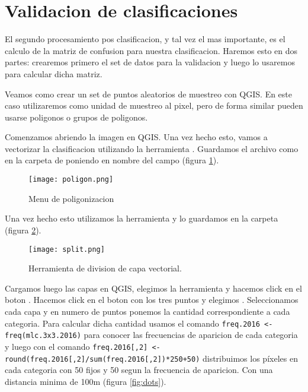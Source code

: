 \section{Validacion de clasificaciones}

El segundo procesamiento pos clasificacion, y tal vez el mas importante, es el calculo de la matriz de confusion para nuestra clasificacion. Haremos esto en dos partes: crearemos primero el set de datos para la validacion y luego lo usaremos para calcular dicha matriz.

\begin{exa}
  Veamos como crear un set de puntos aleatorios de muestreo con QGIS. En este caso utilizaremos como unidad de muestreo al pixel, pero de forma similar pueden usarse poligonos o grupos de poligonos.

  Comenzamos abriendo la imagen  en QGIS. Una vez hecho esto, vamos a vectorizar la clasificacion utilizando la herramienta . Guardamos el archivo como  en la carpeta de  poniendo en nombre del campo  (figura \ref{fig:poligon}).

  \begin{figure}
    \texttt{[image: poligon.png]}
    \caption{Menu de poligonizacion}
    \label{fig:poligon}
  \end{figure}

  Una vez hecho esto utilizamos la herramienta  y lo
  guardamos en la carpeta  (figura \ref{fig:split}).

  \begin{figure}
    \texttt{[image: split.png]}
    \caption{Herramienta de division de capa vectorial.}
    \label{fig:split}
  \end{figure}

  Cargamos luego las capas en
  QGIS, elegimos la herramienta 
  y hacemos click en el boton . Hacemos click en el boton con los tres puntos y elegimos .  Seleccionamos cada
  capa y en numero de puntos ponemos la cantidad correspondiente a cada categoria.
  Para calcular dicha cantidad usamos el comando \texttt{freq.2016 <- freq(mlc.3x3.2016)}
  para conocer las frecuencias de aparicion de cada categoria y luego con el comando
  \texttt{freq.2016[,2] <- round(freq.2016[,2]/sum(freq.2016[,2])*250+50)} distribuimos
  los p\'ixeles en cada categoria con 50 fijos y 50 segun la frecuencia de aparicion.
  Con una distancia minima de 100m (figura \ref{fig:dots}).


\end{exa}
